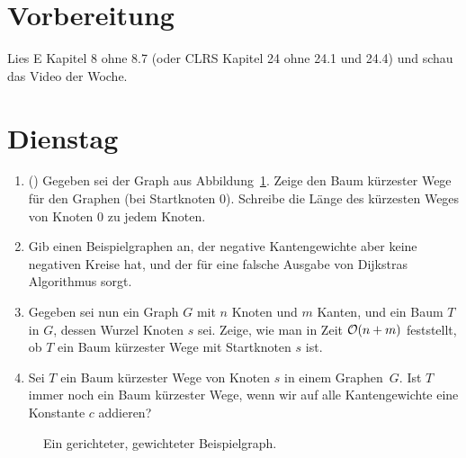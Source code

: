 \documentclass{uebung_cs}
\begin{document}
\section*{Vorbereitung}
Lies E Kapitel 8 ohne 8.7 (oder CLRS Kapitel 24 ohne 24.1 und 24.4) und schau das Video der Woche.

\section*{Dienstag}
\begin{aufgabe}\label{tue-first}\mbox{}
	\begin{enumerate}
		\item (\warmup) Gegeben sei der Graph aus Abbildung~\ref{example_graph}.
		Zeige den Baum kürzester Wege für den Graphen (bei Startknoten 0).
		Schreibe die Länge des kürzesten Weges von Knoten 0 zu jedem Knoten.
		\item Gib einen Beispielgraphen an, der negative Kantengewichte aber keine negativen Kreise hat, und der für eine falsche Ausgabe von Dijkstras Algorithmus sorgt.
		\item Gegeben sei nun ein Graph $G$ mit $n$ Knoten und $m$ Kanten, und ein Baum $T$ in $G$, dessen Wurzel Knoten $s$ sei.
		Zeige, wie man in Zeit $\mathcal{O}(n+m)$ feststellt, ob $T$ ein Baum kürzester Wege mit Startknoten $s$ ist.
		\item Sei $T$ ein Baum kürzester Wege von Knoten $s$ in einem Graphen~$G$.
		Ist $T$ immer noch ein Baum kürzester Wege, wenn wir auf alle Kantengewichte eine Konstante $c$ addieren?
	\end{enumerate}
\end{aufgabe}
\begin{figure}[h]
	\begin{center}
		\caption{\label{example_graph}Ein gerichteter, gewichteter Beispielgraph.}
	\end{center}
\end{figure}
\end{document}
